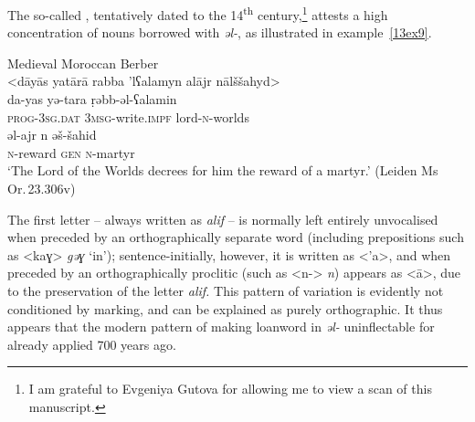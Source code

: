 \documentclass[output=paper,colorlinks,citecolor=brown]{langscibook}
\begin{document}
The so-called , tentatively dated to the 14\textsuperscript{th} century,\footnote{I am grateful to Evgeniya Gutova for allowing me to view a scan of this manuscript.} attests a high concentration of  nouns borrowed with \emph{əl-}, as illustrated in example~\ref{13ex9}.

\begin{exe}
	\ex \label{13ex9} Medieval Moroccan Berber \\
	<dāyās yatārā rabba ’lʕalamyn alājr nālššahyd> \\
	\gll *da-yas yə-tara ṛəbb-əl-ʕalamin \\
	\textsc{prog-3sg.dat} \textsc{3msg}-write.\textsc{impf} lord-\textsc{n}-worlds \\
	\gll əl-ajr n əš-šahid \\
	\textsc{n}-reward \textsc{gen} \textsc{n}-martyr \\
	\trans ‘The Lord of the Worlds decrees for him the reward of a martyr.’ (Leiden Ms Or. 23.306v)
\end{exe}

The first letter -- always written as \emph{alif} -- is normally left entirely unvocalised when preceded by an orthographically separate word (including prepositions such as \textless kaɣ\textgreater{} \emph{gəɣ} `in'); sentence-initially, however, it is written as \textless'a\textgreater, and when preceded by an orthographically proclitic  (such as  \textless n-\textgreater{} \emph{n}) appears as \textless ā\textgreater, due to the preservation of the letter \emph{alif.} This pattern of variation is evidently not conditioned by  marking, and can be explained as purely orthographic. It thus appears that the modern  pattern of making  loanword in \emph{əl-} uninflectable for  already applied 700 years ago.
\end{document}
